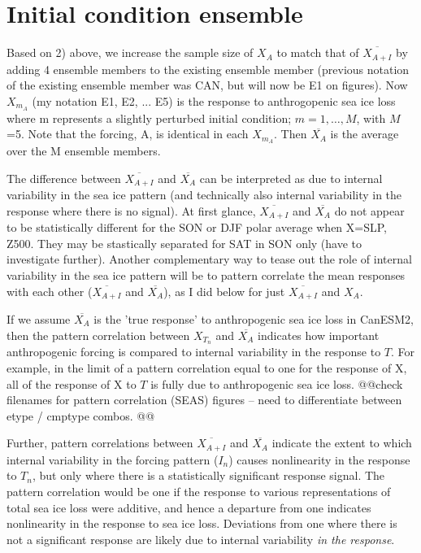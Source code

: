 \documentclass[12pt]{article}
\begin{document}
\section{Initial condition ensemble}
Based on 2) above, we increase the sample size of ${X_{A}}$ to match that of $\overline{X_{A+I}}$ by adding 4 ensemble members to the existing ensemble member (previous notation of the existing ensemble member was CAN, but will now be E1 on figures). Now $X_{m_A}$ (my notation E1, E2, ... E5) is the response to anthrogopenic sea ice loss where m represents a slightly perturbed initial condition; $m=1,\ldots,M$, with $M$=5. Note that the forcing, A, is identical in each $X_{m_A}$. Then $\overline{X_{A}}$ is the average over the M ensemble members.

The difference between $\overline{X_{A+I}}$ and $\overline{X_{A}}$ can be interpreted as due to internal variability in the sea ice pattern (and technically also internal variability in the response where there is no signal). At first glance, $\overline{X_{A+I}}$ and $\overline{X_{A}}$ do not appear to be statistically different for the SON or DJF polar average when X=SLP, Z500. They may be stastically separated for SAT in SON only (have to investigate further). Another complementary way to tease out the role of internal variability in the sea ice pattern will be to pattern correlate the mean responses with each other ($\overline{X_{A+I}}$ and $\overline{X_{A}}$), as I did below for just $\overline{X_{A+I}}$ and $X_A$.

If we assume $\overline{X_{A}}$ is the 'true response' to anthropogenic sea ice loss in CanESM2, then the pattern correlation between $X_{T_n}$  and $\overline{X_{A}}$ indicates how important anthropogenic forcing is compared to internal variability in the response to $T$. For example, in the limit of a pattern correlation equal to one for the response of X, all of the response of X to $T$ is fully due to anthropogenic sea ice loss. 
@@check filenames for pattern correlation (SEAS) figures -- need to differentiate between etype / cmptype combos. @@

Further, pattern correlations between $\overline{X_{A+I}}$ and $\overline{X_{A}}$ indicate the extent to which internal variability in the forcing pattern ($I_n$) causes nonlinearity in the response to $T_n$, but only where there is a statistically significant response signal. The pattern correlation would be one if the response to various representations of total sea ice loss were additive, and hence a departure from one indicates nonlinearity in the response to sea ice loss. Deviations from one where there is not a significant response are likely due to internal variability \textit{in the response}.
\end{document}
